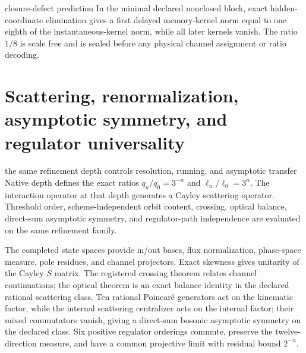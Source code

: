 \documentclass[11pt]{article}
\numberwithin{equation}{section}
\theoremstyle{remark}
\begin{document}
\begin{equationledger}{closure-defect prediction}
In the minimal declared nonclosed block, exact hidden-coordinate elimination gives a first delayed memory-kernel norm equal to one eighth of the instantaneous-kernel norm, while all later kernels vanish. The ratio $1/8$ is scale free and is sealed before any physical channel assignment or ratio decoding.
\end{equationledger}

\section{Scattering, renormalization, asymptotic symmetry, and regulator universality}
\label{sec:scatteringrg}
\begin{conceptledger}{the same refinement depth controls resolution, running, and asymptotic transfer}
Native depth defines the exact ratios $q_n/q_0=3^{-n}$ and $\ell_n/\ell_0=3^n$. The interaction operator at that depth generates a Cayley scattering operator. Threshold order, scheme-independent orbit content, crossing, optical balance, direct-sum asymptotic symmetry, and regulator-path independence are evaluated on the same refinement family.
\end{conceptledger}
The completed state spaces provide in/out bases, flux normalization, phase-space measure, pole residues, and channel projectors. Exact skewness gives unitarity of the Cayley $S$ matrix. The registered crossing theorem relates channel continuations; the optical theorem is an exact balance identity in the declared rational scattering class. Ten rational Poincar\'e generators act on the kinematic factor, while the internal scattering centralizer acts on the internal factor; their mixed commutators vanish, giving a direct-sum bosonic asymptotic symmetry on the declared class. Six positive regulator orderings commute, preserve the twelve-direction measure, and have a common projective limit with residual bound $2^{-n}$.
\end{document}
